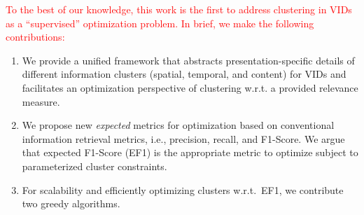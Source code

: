 \textcolor{red}{ To the best of our knowledge, this work is the first to address clustering in VIDs as a ``supervised'' optimization problem. In brief, we make the following contributions:}
\begin{enumerate}
\item We provide a unified framework that abstracts presentation-specific details of different information clusters (spatial, temporal, and content) for VIDs and facilitates an optimization perspective of clustering w.r.t. a provided relevance measure.  
\item We propose new \emph{expected} metrics for optimization based on conventional information retrieval metrics, i.e., precision, recall, and F1-Score.  We argue that expected F1-Score (EF1) is the appropriate metric to optimize subject to parameterized cluster constraints.
\item For scalability and efficiently optimizing clusters w.r.t.\ EF1, we contribute two greedy algorithms.

\end{enumerate}
